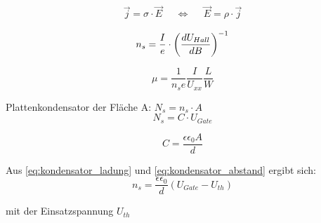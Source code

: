 
\begin{align}
	\vec{j} = \sigma \cdot \vec{E} & & \Leftrightarrow & & \vec{E} = \rho \cdot \vec{j}
	\label{eq:u2rho}
\end{align}

\begin{equation}
	n_s=\frac{I}{e} \cdot \left( \frac{d U_{Hall}}{d B} \right)^{-1}
	\label{eq:ladungsdichte_steig}
\end{equation}

\begin{equation}
\mu=\frac{1}{n_se}\frac{I}{U_{xx}}\frac{L}{W}
\label{eq:bewegl_masse}
\end{equation}


Plattenkondensator der Fläche A: $N_s=n_s \cdot A$ 
\begin{equation}
N_s=C \cdot U_{Gate}
\label{eq:kondensator_ladung}
\end{equation}

\begin{equation}
C=\frac{\epsilon \epsilon_0 A}{d}
\label{eq:kondensator_abstand}
\end{equation}


Aus \ref{eq:kondensator_ladung} und \ref{eq:kondensator_abstand} ergibt sich:
\begin{equation}
n_s=\frac{\epsilon \epsilon_0}{d}(U_{Gate}-U_{th})
\label{eq:kondens_lad_und_abst}
\end{equation}

mit der Einsatzspannung $U_{th}$




